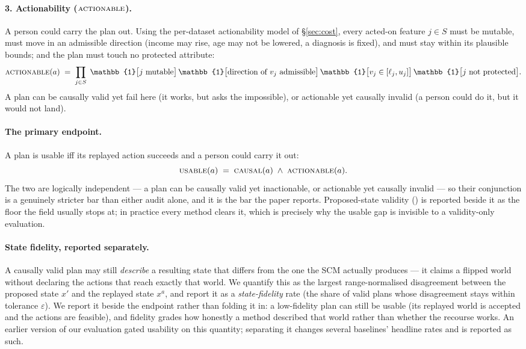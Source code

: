 \paragraph{3. Actionability ($\textsc{actionable}$).} A person could carry the plan out. Using
the per-dataset actionability model of \S\ref{sec:cost}, every acted-on feature
$j\in S$ must be mutable, must move in an admissible direction (income may rise,
age may not be lowered, a diagnosis is fixed), and must stay within its plausible
bounds; and the plan must touch no protected attribute:
\begin{equation}
  \Action(a) \;=\; \prod_{j\in S}\;
    \mathbb{1}\big[\text{$j$ mutable}\big]\,
    \mathbb{1}\big[\text{direction of $v_j$ admissible}\big]\,
    \mathbb{1}\big[v_j\in[\ell_j,u_j]\big]\,
    \mathbb{1}\big[\text{$j$ not protected}\big].
\end{equation}
A plan can be causally valid yet fail here (it works, but asks the impossible),
or actionable yet causally invalid (a person could do it, but it would not
land).

\paragraph{The primary endpoint.} A plan is usable iff its replayed action
succeeds and a person could carry it out:
\begin{equation}
  \textsc{usable}(a) \;=\; \textsc{causal}(a)\;\wedge\;\textsc{actionable}(a).
  \label{eq:usable}
\end{equation}
The two are logically independent --- a plan can be causally valid yet
inactionable, or actionable yet causally invalid --- so their conjunction is a
genuinely stricter bar than either audit alone, and it is the bar the paper
reports. Proposed-state validity (\Valid{}) is reported beside it as the floor the
field usually stops at; in practice every method clears it, which is precisely why
the usable gap is invisible to a validity-only evaluation.

\paragraph{State fidelity, reported separately.} A causally valid plan may still
\emph{describe} a resulting state that differs from the one the SCM actually
produces --- it claims a flipped world without declaring the actions that reach
exactly that world. We quantify this as the largest range-normalised disagreement
between the proposed state $x'$ and the replayed state $x^{a}$, and report it as a
\emph{state-fidelity} rate (the share of valid plans whose disagreement stays
within tolerance $\varepsilon$). We report it beside the endpoint rather than
folding it in: a low-fidelity plan can still be usable (its replayed world is
accepted and the actions are feasible), and fidelity grades how honestly a method
described that world rather than whether the recourse works. An earlier version of
our evaluation gated usability on this quantity; separating it changes several
baselines' headline rates and is reported as such.

